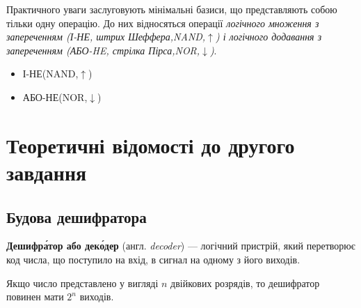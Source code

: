 Практичного уваги заслуговують мінімальні базиси, що представляють собою тільки одну операцію. До них відносяться операції \emph{логічного множення з запереченням (І-НЕ, штрих Шеффера,NAND,$\uparrow$) і логічного додавання з запереченням (АБО-HE, стрілка Пірса,NOR,$\downarrow$)}.

\begin{itemize}
	\item І-НЕ(NAND,$\uparrow$)
	\item АБО-НЕ(NOR,$\downarrow$)
\end{itemize}

\newpage
\section{Теоретичні відомості до другого завдання}
\subsection{Будова дешифратора}
\textbf{Дешифра́тор або деко́дер} (англ. \emph{decoder}) — логічний пристрій, який перетворює код числа, що поступило на вхід, в сигнал на одному з його виходів.

Якщо число представлено у вигляді $n$ двійкових розрядів, то дешифратор повинен мати $2^{n}$ виходів.

